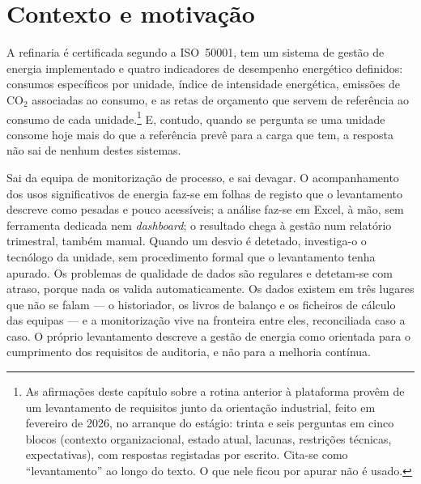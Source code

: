 \section{Contexto e motivação}
\label{sec:contexto}

 A refinaria é certificada segundo a ISO~50001, tem um sistema
de gestão de energia implementado e quatro indicadores de desempenho
energético definidos: consumos específicos por unidade, índice de
intensidade energética, emissões de CO$_2$ associadas ao consumo, e as
retas de orçamento que servem de referência ao consumo de cada
unidade.\footnote{As afirmações deste capítulo sobre a rotina anterior à
plataforma provêm de um levantamento de requisitos junto da orientação
industrial, feito em fevereiro de 2026, no arranque do estágio: trinta e
seis perguntas em cinco blocos (contexto organizacional, estado atual,
lacunas, restrições técnicas, expectativas), com respostas registadas por
escrito. Cita-se como \enquote{levantamento} ao longo do texto. O que
nele ficou por apurar não é usado.} E, contudo, quando se pergunta se uma
unidade consome hoje mais do que a referência prevê para a carga que tem,
a resposta não sai de nenhum destes sistemas.

Sai da equipa de monitorização de processo, e sai devagar. O
acompanhamento dos usos significativos de energia faz-se em folhas de
registo que o levantamento descreve como pesadas e pouco acessíveis; a
análise faz-se em Excel, à mão, sem ferramenta dedicada nem
\emph{dashboard}; o resultado chega à gestão num relatório trimestral,
também manual. Quando um desvio é detetado, investiga-o o tecnólogo da
unidade, sem procedimento formal que o levantamento tenha apurado. Os
problemas de qualidade de dados são regulares e detetam-se com atraso,
porque nada os valida automaticamente. Os dados existem em três lugares
que não se falam --- o historiador, os livros de balanço e os ficheiros
de cálculo das equipas --- e a monitorização vive na fronteira entre
eles, reconciliada caso a caso. O próprio levantamento descreve a gestão
de energia como orientada para o cumprimento dos requisitos de auditoria,
e não para a melhoria contínua. 


